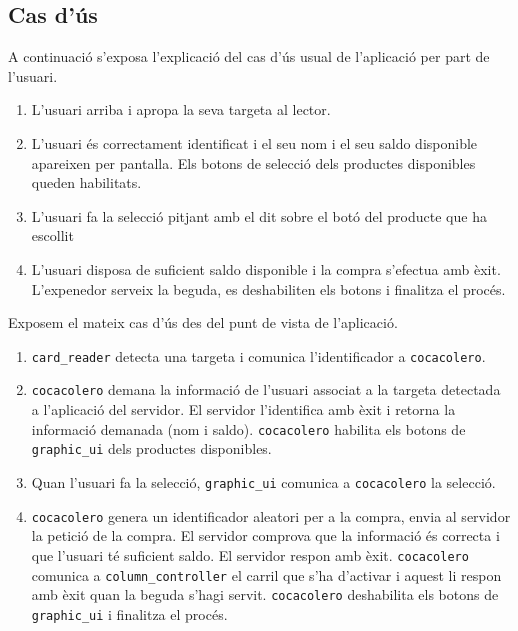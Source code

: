 \subsection{Cas d'ús}
A continuació s'exposa l'explicació del cas d'ús usual de l'aplicació per part de l'usuari.
\begin{enumerate}
\item L'usuari arriba i apropa la seva targeta al lector.
\item L'usuari és correctament identificat i el seu nom i el seu saldo disponible apareixen per pantalla. Els botons de selecció dels productes disponibles queden habilitats.
\item L'usuari fa la selecció pitjant amb el dit sobre el botó del producte que ha escollit
\item L'usuari disposa de suficient saldo disponible i la compra s'efectua amb èxit. L'expenedor serveix la beguda, es deshabiliten els botons i finalitza el procés.
\end{enumerate}

Exposem el mateix cas d'ús des del punt de vista de l'aplicació.
\begin{enumerate}
\item \texttt{card\_reader} detecta una targeta i comunica l'identificador a \texttt{cocacolero}.
\item \texttt{cocacolero} demana la informació de l'usuari associat a la targeta detectada a l'aplicació del servidor. El servidor l'identifica amb èxit i retorna la informació demanada (nom i saldo). \texttt{cocacolero} habilita els botons de \texttt{graphic\_ui} dels productes disponibles.
\item Quan l'usuari fa la selecció, \texttt{graphic\_ui} comunica a \texttt{cocacolero} la selecció.
\item \texttt{cocacolero} genera un identificador aleatori per a la compra, envia al servidor la petició de la compra. El servidor comprova que la informació és correcta i que l'usuari té suficient saldo. El servidor respon amb èxit. \texttt{cocacolero} comunica a \texttt{column\_controller} el carril que s'ha d'activar i aquest li respon amb èxit quan la beguda s'hagi servit. \texttt{cocacolero} deshabilita els botons de \texttt{graphic\_ui} i finalitza el procés.
\end{enumerate}

